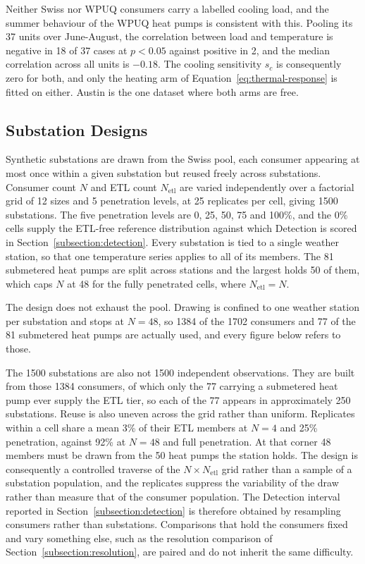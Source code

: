 \documentclass[9pt,journal,a4]{IEEEtran}
\begin{document}
Neither Swiss nor WPUQ consumers carry a labelled cooling load, and the summer behaviour of the WPUQ heat pumps is consistent with this. Pooling its 37 units over June-August, the correlation between load and temperature is negative in 18 of 37 cases at $p<0.05$ against positive in 2, and the median correlation across all units is $-0.18$. The cooling sensitivity $s_c$ is consequently zero for both, and only the heating arm of Equation~\eqref{eq:thermal-response} is fitted on either. Austin is the one dataset where both arms are free.


\subsection{Substation Designs}
\label{subsection:designs}

Synthetic substations are drawn from the Swiss pool, each consumer appearing at most once within a given substation but reused freely across substations. Consumer count $N$ and ETL count $N_{\mathrm{etl}}$ are varied independently over a factorial grid of 12 sizes and 5 penetration levels, at 25 replicates per cell, giving 1500 substations. The five penetration levels are 0, 25, 50, 75 and 100\%, and the 0\% cells supply the ETL-free reference distribution against which Detection is scored in Section~\ref{subsection:detection}. Every substation is tied to a single weather station, so that one temperature series applies to all of its members. The 81 submetered heat pumps are split across stations and the largest holds 50 of them, which caps $N$ at 48 for the fully penetrated cells, where $N_{\mathrm{etl}} = N$.

The design does not exhaust the pool. Drawing is confined to one weather station per substation and stops at $N = 48$, so 1384 of the 1702 consumers and 77 of the 81 submetered heat pumps are actually used, and every figure below refers to those.

The 1500 substations are also not 1500 independent observations. They are built from those 1384 consumers, of which only the 77 carrying a submetered heat pump ever supply the ETL tier, so each of the 77 appears in approximately 250 substations. Reuse is also uneven across the grid rather than uniform. Replicates within a cell share a mean 3\% of their ETL members at $N = 4$ and 25\% penetration, against 92\% at $N = 48$ and full penetration. At that corner 48 members must be drawn from the 50 heat pumps the station holds. The design is consequently a controlled traverse of the $N \times N_{\mathrm{etl}}$ grid rather than a sample of a substation population, and the replicates suppress the variability of the draw rather than measure that of the consumer population. The Detection interval reported in Section~\ref{subsection:detection} is therefore obtained by resampling consumers rather than substations. Comparisons that hold the consumers fixed and vary something else, such as the resolution comparison of Section~\ref{subsection:resolution}, are paired and do not inherit the same difficulty.
\end{document}
